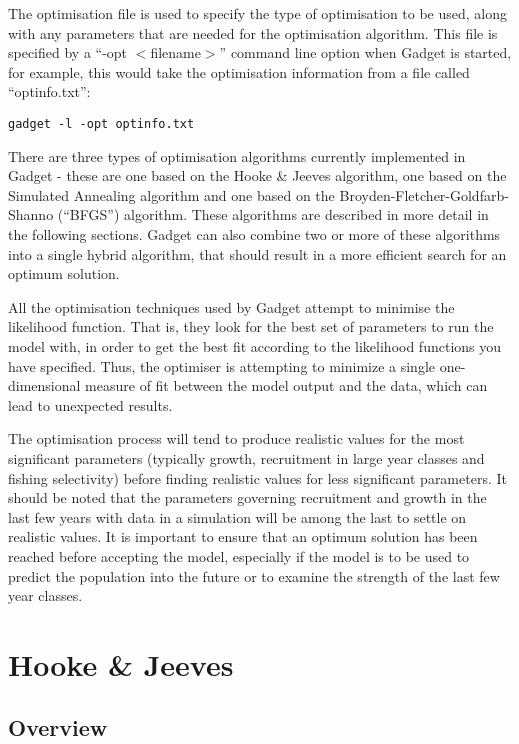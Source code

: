 \documentclass[]{book}
\begin{document}
The optimisation file is used to specify the type of optimisation to be
used, along with any parameters that are needed for the optimisation
algorithm. This file is specified by a ``-opt \(<\)filename\(>\)'' command
line option when Gadget is started, for example, this would take the
optimisation information from a file called ``optinfo.txt'':

\begin{verbatim}
gadget -l -opt optinfo.txt
\end{verbatim}

There are three types of optimisation algorithms currently implemented
in Gadget - these are one based on the Hooke \& Jeeves algorithm, one
based on the Simulated Annealing algorithm and one based on the
Broyden-Fletcher-Goldfarb-Shanno (``BFGS'') algorithm. These algorithms
are described in more detail in the following sections. Gadget can also
combine two or more of these algorithms into a single hybrid algorithm,
that should result in a more efficient search for an optimum solution.

All the optimisation techniques used by Gadget attempt to minimise the
likelihood function. That is, they look for the best set of parameters
to run the model with, in order to get the best fit according to the
likelihood functions you have specified. Thus, the optimiser is
attempting to minimize a single one-dimensional measure of fit between
the model output and the data, which can lead to unexpected results.

The optimisation process will tend to produce realistic values for the
most significant parameters (typically growth, recruitment in large year
classes and fishing selectivity) before finding realistic values for
less significant parameters. It should be noted that the parameters
governing recruitment and growth in the last few years with data in a
simulation will be among the last to settle on realistic values. It is
important to ensure that an optimum solution has been reached before
accepting the model, especially if the model is to be used to predict
the population into the future or to examine the strength of the last
few year classes.

\hypertarget{sec:hooke}{%
\section{Hooke \& Jeeves}\label{sec:hooke}}

\hypertarget{subsec:hookeover}{%
\subsection{Overview}\label{subsec:hookeover}}
\end{document}
